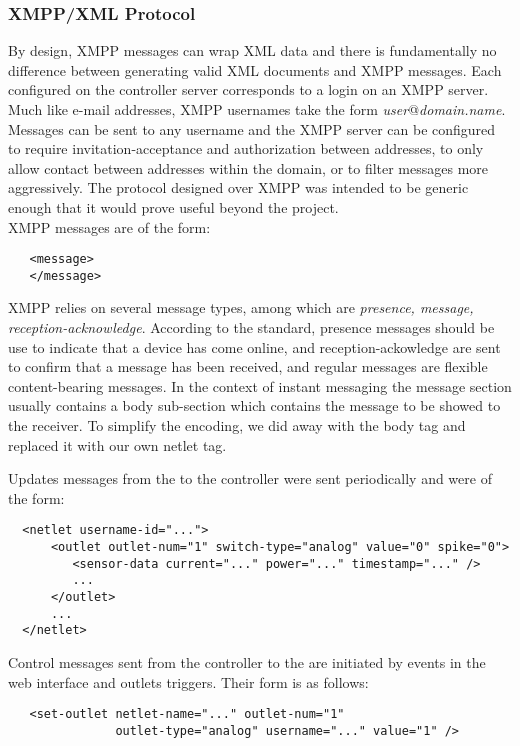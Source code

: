 \subsubsection{XMPP/XML Protocol}
By design, XMPP messages can wrap XML data and there is fundamentally no difference between generating valid XML documents and XMPP messages.  Each configured \netlet on the controller server corresponds to a login on an XMPP server. Much like e-mail addresses, XMPP usernames take the form \emph{user}@\emph{domain.name}.  Messages can be sent to any username and the XMPP server can be configured to require invitation-acceptance and authorization between addresses, to only allow contact between addresses within the domain, or to filter messages more aggressively.  The protocol designed over XMPP was intended to be generic enough that it would prove useful beyond the \netlet project.\\

XMPP messages are of the form:
\begin{verbatim}
   <message>
   </message>
\end{verbatim}

XMPP relies on several message types, among which are \emph{presence, message, reception-acknowledge}. According to the standard, presence messages should be use to indicate that a device has come online, and reception-ackowledge are sent to confirm that a message has been received, and regular messages are flexible content-bearing messages. In the context of instant messaging the message section usually contains a body sub-section which contains the message to be showed to the receiver. To simplify the encoding, we did away with the body tag and replaced it with our own netlet tag.

Updates messages from the \netlet to the controller were sent periodically and were of the form:
\begin{verbatim}
  <netlet username-id="...">
      <outlet outlet-num="1" switch-type="analog" value="0" spike="0">
         <sensor-data current="..." power="..." timestamp="..." />
         ...
      </outlet>
      ...
  </netlet>
\end{verbatim}

Control messages sent from the controller to the \netlet are initiated by events in the web interface and outlets triggers.  Their form is as follows:

\begin{verbatim}
   <set-outlet netlet-name="..." outlet-num="1"
               outlet-type="analog" username="..." value="1" />
\end{verbatim}

